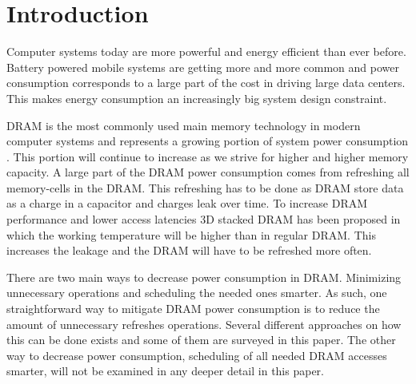 \section{Introduction}
\label{sec:int}
Computer systems today are more powerful and energy efficient than ever before. Battery powered mobile systems are getting more and more common and power consumption corresponds to a large part of the cost in driving large data centers. This makes energy consumption an increasingly big system design constraint.

DRAM is the most commonly used main memory technology in modern computer systems and represents a growing portion of system power consumption \cite{exascale}. This portion will continue to increase as we strive for higher and higher memory capacity. A large part of the DRAM power consumption comes from refreshing all memory-cells in the DRAM. This refreshing has to be done as DRAM store data as a charge in a capacitor and charges leak over time. To increase DRAM performance and lower access latencies 3D stacked DRAM has been proposed in which the working temperature will be higher than in regular DRAM. This increases the leakage and the DRAM will have to be refreshed more often.

There are two main ways to decrease power consumption in DRAM. Minimizing unnecessary operations and scheduling the needed ones smarter. As such, one straightforward way to mitigate DRAM power consumption is to reduce the amount of unnecessary refreshes operations. Several different approaches on how this can be done exists and some of them are surveyed in this paper. The other way to decrease power consumption, scheduling of all needed DRAM accesses smarter, will not be examined in any deeper detail in this paper.  
